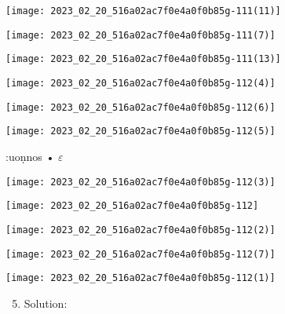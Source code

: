 \documentclass[10pt]{article}
\begin{document}
\begin{enumerate}
\begin{enumerate}
\begin{center}
\texttt{[image: 2023\_02\_20\_516a02ac7f0e4a0f0b85g-111(11)]}
\end{center}

\begin{center}
\texttt{[image: 2023\_02\_20\_516a02ac7f0e4a0f0b85g-111(7)]}
\end{center}

\begin{center}
\texttt{[image: 2023\_02\_20\_516a02ac7f0e4a0f0b85g-111(13)]}
\end{center}

\begin{center}
\texttt{[image: 2023\_02\_20\_516a02ac7f0e4a0f0b85g-112(4)]}
\end{center}

\begin{center}
\texttt{[image: 2023\_02\_20\_516a02ac7f0e4a0f0b85g-112(6)]}
\end{center}

\begin{center}
\texttt{[image: 2023\_02\_20\_516a02ac7f0e4a0f0b85g-112(5)]}
\end{center}

:uoṇnos • $\varepsilon$

\begin{center}
\texttt{[image: 2023\_02\_20\_516a02ac7f0e4a0f0b85g-112(3)]}
\end{center}

\begin{center}
\texttt{[image: 2023\_02\_20\_516a02ac7f0e4a0f0b85g-112]}
\end{center}

\begin{center}
\texttt{[image: 2023\_02\_20\_516a02ac7f0e4a0f0b85g-112(2)]}
\end{center}

\begin{center}
\texttt{[image: 2023\_02\_20\_516a02ac7f0e4a0f0b85g-112(7)]}
\end{center}

\begin{center}
\texttt{[image: 2023\_02\_20\_516a02ac7f0e4a0f0b85g-112(1)]}
\end{center}

\begin{enumerate}
  \setcounter{enumi}{4}
  \item Solution:
\end{enumerate}


\end{enumerate}
\end{enumerate}
\end{document}
